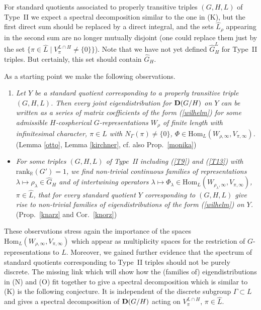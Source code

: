 \documentclass[10]{amsart}
\theoremstyle{remark}
\theoremstyle{definition}
\numberwithin{equation}{section}
\newcommand{\R}{\mathbb{R}}           %
\newcommand{\rank}{\text{rank}}
\newcommand{\Hom}{\mathrm{Hom}}
\begin{document}
For standard quotients associated to properly transitive triples $(G,H,L)$ of Type~II we expect a spectral decomposition similar to the one in (K), but the first direct sum
should be replaced by a direct integral, and the sets $\widehat L_\rho$ appearing in the second sum are no longer mutually disjoint (one could replace them just by 
the set $\{\pi\in\widehat L\mid V_\pi^{L\cap H}\neq\{0\}\}$).         
Note that we have not yet defined $\widehat G_H^L$ for Type~II triples. But certainly, this set should contain $\widehat G_H$.

As a starting point we make the following observations.
\begin{enumerate}
\item[({\bf N})] 
{\em Let $Y$ be a standard quotient corresponding to a properly transitive triple $(G,H,L)$. Then every joint eigendistribution for ${\bf D}(G/H)$ on $Y$
can be written as a series of matrix coefficients of the form (\ref{wilhelm}) for some admissible $H$-cospherical $G$-representations $W_\rho$ of finite length with infinitesimal character,
$\pi\in\hat L$ with $N_\Gamma(\pi)\ne\{0\}$, $\Phi\in\Hom_L(W_{\rho,\infty},V_{\pi,\infty})$.} (Lemma \ref{otto}, Lemma \ref{kirchner}, cf. also Prop.~\ref{monika}) 
\end{enumerate}
\begin{itemize}
\item[({\bf O})] {\em For some triples $(G,H,L)$ of Type~II including (\ref{T9}) and (\ref{T13}) with $\rank_\R(G')=1$, we find non-trivial continuous families of representations $\lambda\mapsto\rho_\lambda\in \widehat G_H$ and of intertwining operators $\lambda\mapsto\Phi_\lambda\in \Hom_L(W_{\rho_\lambda,\infty},V_{\pi,\infty})$, $\pi\in\widehat L$, that for every standard quotient $Y$ corresponding to $(G,H,L)$ give rise to non-trivial families
of eigendistributions of the form (\ref{wilhelm}) on $Y$.} (Prop.~\ref{knarz} and Cor.~\ref{knorz})
\end{itemize}
These observations stress again the importance of the spaces $\Hom_L(W_{\rho,\infty},V_{\pi,\infty})$ which appear as multiplicity spaces for the
restriction of $G$-representations to $L$. 
Moreover, we gained further evidence that the spectrum of standard quotients corresponding to Type~II triples should not be purely discrete.
The missing link which will show how the (families of) eigendistributions in (N) and (O) fit together to give a spectral decomposition 
which is similar to (K) 
is the following conjecture. It is independent of the discrete subgroup $\Gamma\subset L$ and gives a spectral decomposition of ${\bf D}(G/H)$ acting on $V_\pi^{L\cap H}$, $\pi\in\widehat L$.
\end{document}
